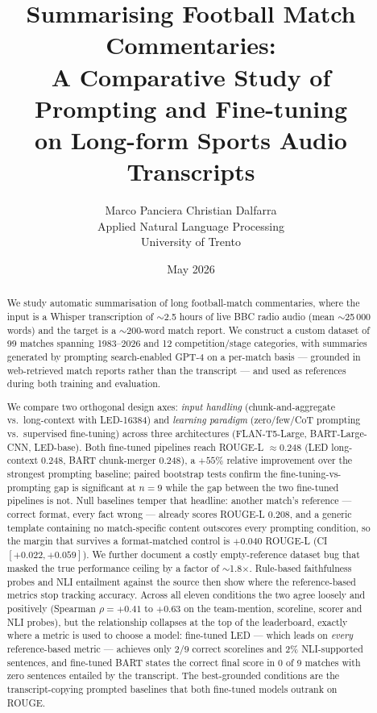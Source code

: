 \documentclass[10pt,a4paper]{article}
\title{\textbf{Summarising Football Match Commentaries:\\
A Comparative Study of Prompting and Fine-tuning\\
on Long-form Sports Audio Transcripts}}
\author{Marco Panciera \quad Christian Dalfarra\\
\small Applied Natural Language Processing\\
\small University of Trento}
\date{May 2026}
\begin{document}
\maketitle

\begin{abstract}
We study automatic summarisation of long football-match commentaries, where the input is a Whisper transcription of $\sim$2.5 hours of live BBC radio audio (mean $\sim$25\,000 words) and the target is a $\sim$200-word match report. We construct a custom dataset of 99 matches spanning 1983--2026 and 12 competition/stage categories, with summaries generated by prompting search-enabled GPT-4 on a per-match basis --- grounded in web-retrieved match reports rather than the transcript --- and used as references during both training and evaluation.

We compare two orthogonal design axes: \emph{input handling} (chunk-and-aggregate vs.\ long-context with LED-16384) and \emph{learning paradigm} (zero/few/CoT prompting vs.\ supervised fine-tuning) across three architectures (FLAN-T5-Large, BART-Large-CNN, LED-base). Both fine-tuned pipelines reach ROUGE-L $\approx 0.248$ (LED long-context $0.248$, BART chunk-merger $0.248$), a $+55\%$ relative improvement over the strongest prompting baseline; paired bootstrap tests confirm the fine-tuning-vs-prompting gap is significant at $n=9$ while the gap between the two fine-tuned pipelines is not. Null baselines temper that headline: another match's reference --- correct format, every fact wrong --- already scores ROUGE-L 0.208, and a generic template containing no match-specific content outscores every prompting condition, so the margin that survives a format-matched control is $+0.040$ ROUGE-L (CI $[+0.022, +0.059]$). We further document a costly empty-reference dataset bug that masked the true performance ceiling by a factor of $\sim$1.8$\times$. Rule-based faithfulness probes and NLI entailment against the source then show where the reference-based metrics stop tracking accuracy. Across all eleven conditions the two agree loosely and positively (Spearman $\rho = +0.41$ to $+0.63$ on the team-mention, scoreline, scorer and NLI probes), but the relationship collapses at the top of the leaderboard, exactly where a metric is used to choose a model: fine-tuned LED --- which leads on \emph{every} reference-based metric --- achieves only 2/9 correct scorelines and 2\% NLI-supported sentences, and fine-tuned BART states the correct final score in 0 of 9 matches with zero sentences entailed by the transcript. The best-grounded conditions are the transcript-copying prompted baselines that both fine-tuned models outrank on ROUGE.
\end{abstract}
\end{document}
